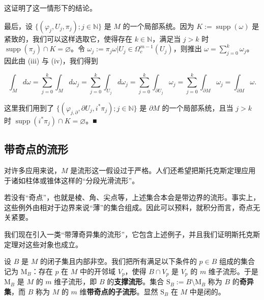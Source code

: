 \begin{theorem}
\begin{subitems}
这证明了这一情形下的结论。

\item

最后，设 $ \{(\varphi_j, U_j, \pi_j) ; j \in \mathbb{N}\} $ 是 $ M $ 的一个局部系统。因为 $ K := \operatorname{supp}(\omega) $ 是紧致的，我们可以这样选取它，使得存在 $ k \in \mathbb{N} $，满足当 $ j > k $ 时 $ \operatorname{supp}(\pi_j) \cap K = \varnothing $。令 $ \omega_j := \pi_j\omega|U_j \in \Omega_c^{m-1}(U_j) $，则推出 $ \omega = \sum_{j=0}^{k} \omega_j $。因此由 (iii) 与 (iv)，我们得到

\[
\int_M d\omega = \sum_{j=0}^{k} \int_M d\omega_j = \sum_{j=0}^{k} \int_{U_j} d\omega_j = \sum_{j=0}^{k} \int_{\partial U_j} \omega_j = \sum_{j=0}^{k} \int_{\partial M} \omega_j = \int_{\partial M} \omega.
\]

这里我们用到了 $ \{(\varphi_{j,\partial}, \partial U_j, i^*\pi_j) ; j \in \mathbb{N}\} $ 是 $ \partial M $ 的一个局部系统，且当 $ j > k $ 时 $ \operatorname{supp}(i^*\pi_j) \cap K = \varnothing $。\nobreak\hspace{0.35em}■

\end{subitems}

\end{theorem}

\subsection*{带奇点的流形}

对许多应用来说，$ M $ 是流形这一假设过于严格。人们还希望把斯托克斯定理应用于诸如柱体或锥体这样的“分段光滑流形”。


若没有“奇点”，也就是棱、角、尖点等，上述集合本会是带边界的流形。事实上，这些例外由相对于边界来说“薄”的集合组成。因此可以预料，就积分而言，奇点无关紧要。

我们现在引入一类“带薄奇异集的流形”，它包含上述例子，并且我们证明斯托克斯定理对这些对象也成立。

设 $ B $ 是 $ M $ 的闭子集且内部非空。我们把所有满足以下条件的 $ p \in B $ 组成的集合记为 $ \mathrm{M}_B $：存在 $ p $ 在 $ M $ 中的开邻域 $ V_p $，使得 $ B \cap V_p $ 是 $ V_p $ 的 $ m $ 维子流形。于是 $ \mathrm{M}_B $ 是 $ M $ 的 $ m $ 维子流形，即 $ B $ 的\textbf{支撑流形}。集合 $ \mathrm{S}_B := B \setminus \mathrm{M}_B $ 称为 $ B $ 的\textbf{奇异集}，而 $ B $ 称为 $ M $ 的 $ m $ 维\textbf{带奇点的子流形}。显然 $ \mathrm{S}_B $ 在 $ M $ 中是闭的。

